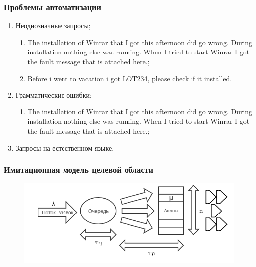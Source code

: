 \documentclass[14pt]{beamer}
\begin{document}
\begin{frame}
\frametitle{Проблемы автоматизации}
\begin{enumerate}
 \item Неоднозначные запросы;
	\begin{enumerate}
 		\item The installation of Winrar that I got this afternoon did go wrong. During installation nothing else was running. When I tried to start Winrar I got the fault message that is attached here.;
 		\item Before i went to vacation i got LOT234, please check if it installed.
	\end{enumerate}
 \item Грамматические ошибки;
  \begin{enumerate}
 		\item The installation of Winrar that I got this afternoon did go wrong. During installation nothing else was running. When I tried to start Winrar I got the fault message that is attached here.;
 
	\end{enumerate}
	
  \item Запросы на естественном языке.
\end{enumerate}
\end{frame}


\begin{frame}
\frametitle{Имитационная модель целевой области}
\begin{figure} [h] 
  \center
  \includegraphics [scale=0.5] {mass_service}
  \label{img:mass_service}  
\end{figure}

\end{frame}
\end{document}
